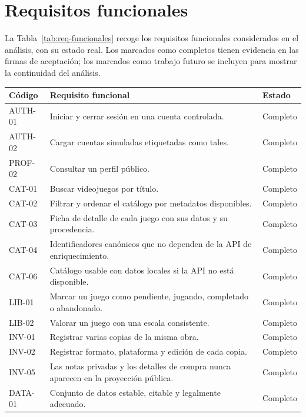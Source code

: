 \section{Requisitos funcionales}\label{sec:req-funcionales}

La Tabla~\ref{tab:req-funcionales} recoge los requisitos funcionales considerados en el
análisis, con su estado real. Los marcados como completos tienen evidencia en las firmas de
aceptación; los marcados como trabajo futuro se incluyen para mostrar la continuidad del
análisis.

\begin{table}[H]
\centering
\begin{tabularx}{\textwidth}{ | Y | Y | Z | }
    \hline
    \textbf{Código} & \textbf{Requisito funcional} & \textbf{Estado} \\
    \hline
    AUTH-01 & Iniciar y cerrar sesión en una cuenta controlada. & Completo \\
    \hline
    AUTH-02 & Cargar cuentas simuladas etiquetadas como tales. & Completo \\
    \hline
    PROF-02 & Consultar un perfil público. & Completo \\
    \hline
    CAT-01 & Buscar videojuegos por título. & Completo \\
    \hline
    CAT-02 & Filtrar y ordenar el catálogo por metadatos disponibles. & Completo \\
    \hline
    CAT-03 & Ficha de detalle de cada juego con sus datos y su procedencia. & Completo \\
    \hline
    CAT-04 & Identificadores canónicos que no dependen de la API de enriquecimiento. & Completo \\
    \hline
    CAT-06 & Catálogo usable con datos locales si la API no está disponible. & Completo \\
    \hline
    LIB-01 & Marcar un juego como pendiente, jugando, completado o abandonado. & Completo \\
    \hline
    LIB-02 & Valorar un juego con una escala consistente. & Completo \\
    \hline
    INV-01 & Registrar varias copias de la misma obra. & Completo \\
    \hline
    INV-02 & Registrar formato, plataforma y edición de cada copia. & Completo \\
    \hline
    INV-05 & Las notas privadas y los detalles de compra nunca aparecen en la proyección pública. & Completo \\
    \hline
    DATA-01 & Conjunto de datos estable, citable y legalmente adecuado. & Completo \\

\end{tabularx}
\end{table}
